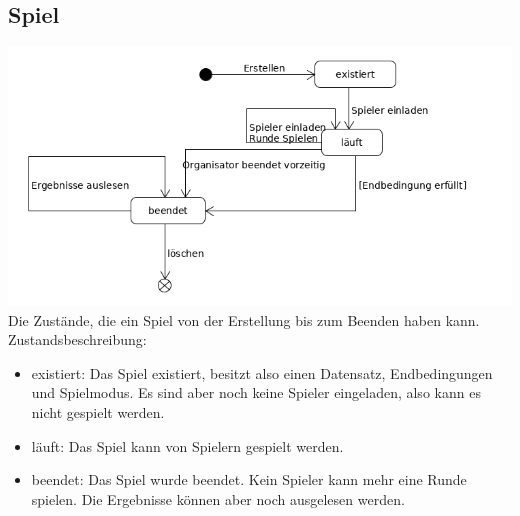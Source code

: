 \documentclass[a4paper]{scrreprt}
\begin{document}
    \subsection{Spiel}
    \label{fig:Spiel_State}
    \includegraphics[width=\textwidth]{uml/export/Spiel_Zustand.png}
    Die Zustände, die ein \Gls{Spiel} von der Erstellung bis zum Beenden haben kann.
    Zustandsbeschreibung:
    \begin{itemize}
    \item existiert: Das \Gls{Spiel} existiert, besitzt also einen Datensatz, Endbedingungen und Spielmodus. Es sind aber noch keine \Gls{Spieler} eingeladen, also kann es nicht gespielt werden.
    \item läuft: Das \Gls{Spiel} kann von \Gls{Spieler}n gespielt werden.
    \item beendet: Das \Gls{Spiel} wurde beendet. Kein \Gls{Spieler} kann mehr eine Runde spielen. Die Ergebnisse können aber noch ausgelesen werden.
    \end{itemize}
\end{document}
